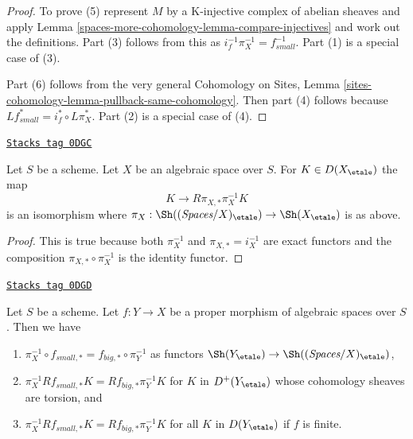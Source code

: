\begin{proof}
To prove (5) represent $M$ by a K-injective complex of abelian sheaves
and apply Lemma \ref{spaces-more-cohomology-lemma-compare-injectives}
and work out the definitions. Part (3) follows from
this as $i_f^{-1}\pi_X^{-1} = f_{small}^{-1}$. Part (1) is a special
case of (3).

\medskip\noindent
Part (6) follows from the very general Cohomology on Sites, Lemma
\ref{sites-cohomology-lemma-pullback-same-cohomology}. Then part
(4) follows because $Lf_{small}^* = i_f^* \circ L\pi_X^*$.
Part (2) is a special case of (4).
\end{proof}

\begin{lemma}
\label{spaces-more-cohomology-lemma-cohomological-descent-etale}
\href{https://stacks.math.columbia.edu/tag/0DGC}{\texttt{Stacks tag 0DGC}}

Let $S$ be a scheme. Let $X$ be an algebraic space over $S$.
For $K \in D(X_\etale)$ the map
$$
K \longrightarrow R\pi_{X, *}\pi_X^{-1}K
$$
is an isomorphism where
$\pi_X : \Sh((\textit{Spaces}/X)_\etale) \to \Sh(X_\etale)$ is as above.
\end{lemma}

\begin{proof}
This is true because both $\pi_X^{-1}$ and $\pi_{X, *} = i_X^{-1}$
are exact functors and the composition $\pi_{X, *} \circ \pi_X^{-1}$
is the identity functor.
\end{proof}

\begin{lemma}
\label{spaces-more-cohomology-lemma-compare-higher-direct-image-proper}
\href{https://stacks.math.columbia.edu/tag/0DGD}{\texttt{Stacks tag 0DGD}}

Let $S$ be a scheme.
Let $f : Y \to X$ be a proper morphism of algebraic spaces over $S$.
Then we have
\begin{enumerate}
\item $\pi_X^{-1} \circ f_{small, *} = f_{big, *} \circ \pi_Y^{-1}$
as functors $\Sh(Y_\etale) \to \Sh((\textit{Spaces}/X)_\etale)$,
\item $\pi_X^{-1}Rf_{small, *}K = Rf_{big, *}\pi_Y^{-1}K$
for $K$ in $D^+(Y_\etale)$ whose cohomology sheaves are torsion, and
\item $\pi_X^{-1}Rf_{small, *}K = Rf_{big, *}\pi_Y^{-1}K$
for all $K$ in $D(Y_\etale)$ if $f$ is finite.
\end{enumerate}
\end{lemma}

